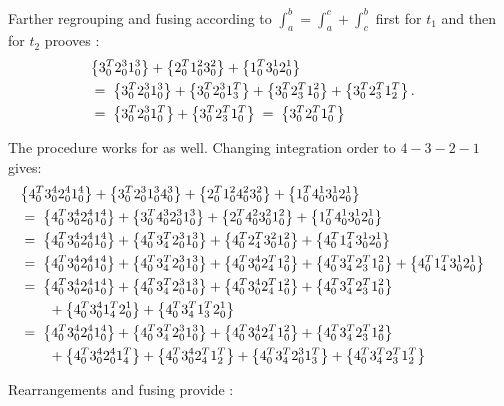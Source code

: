 \documentclass{article}
\def\braced#1{\left\lbrace{#1}\right\rbrace}
\begin{document}
Farther regrouping and fusing according to $\int_a^b = \int_a^c + \int_c^b$ first for $t_1$ and then for $t_2$ prooves :
\begin{align*}
\lefteqn{\braced{3_0^T 2_0^3 1_0^3} + \braced{2_0^T 1_0^2 3_0^2} 
 + \braced{1_0^T 3_0^1 2_0^1}}
\\ & = \; 
\braced{3_0^T 2_0^3 1_0^3}  + \braced{3_0^T 2_0^3 1_3^T} 
+ \braced{3_0^T 2_3^T 1_0^2} + \braced{3_0^T 2_3^T 1_2^T}.
\\ & = \; 
\braced{3_0^T 2_0^3 1_0^T} + \braced{3_0^T 2_3^T 1_0^T} 
\; = \; 
\braced{3_0^T 2_0^T 1_0^T} 

\end{align*}

\p
The procedure works for  as well. Changing integration order to $4-3-2-1$ gives:
\begin{align*}
\lefteqn{\braced{4_0^T 3_0^4 2_0^4 1_0^4} + \braced{3_0^T 2_0^3 1_0^3 4_0^3} 
+ \braced{2_0^T 1_0^2 4_0^2 3_0^2} + \braced{1_0^T 4_0^1 3_0^1 2_0^1}}
\\ & = \; 
\braced{4_0^T 3_0^4 2_0^4 1_0^4} 
+ \braced{3_0^T 4_0^3 2_0^3 1_0^3} 
+ \braced{2_0^T 4_0^2 3_0^2 1_0^2}
+ \braced{1_0^T 4_0^1 3_0^1 2_0^1}
\\ & = \; 
\braced{4_0^T 3_0^4 2_0^4 1_0^4} 
+ \braced{4_0^T 3_4^T 2_0^3 1_0^3} 
+ \braced{4_0^T 2_4^T 3_0^2 1_0^2}
+ \braced{4_0^T 1_4^T 3_0^1 2_0^1}
\\ & = \; 
\braced{4_0^T 3_0^4 2_0^4 1_0^4} 
+ \braced{4_0^T 3_4^T 2_0^3 1_0^3} 
+ \braced{4_0^T 3_0^4 2_4^T 1_0^2}+ \braced{4_0^T 3_4^T 2_3^T 1_0^2}
+ \braced{4_0^T 1_4^T 3_0^1 2_0^1}
\\ & = \; 
\braced{4_0^T 3_0^4 2_0^4 1_0^4} 
+ \braced{4_0^T 3_4^T 2_0^3 1_0^3} 
+ \braced{4_0^T 3_0^4 2_4^T 1_0^2} + \braced{4_0^T 3_4^T 2_3^T 1_0^2}
\\ & \qquad
+ \braced{4_0^T 3_0^4 1_4^T 2_0^1} + \braced{4_0^T 3_4^T 1_3^T 2_0^1}
\\ & = \; 
\braced{4_0^T 3_0^4 2_0^4 1_0^4} 
+ \braced{4_0^T 3_4^T 2_0^3 1_0^3} 
+ \braced{4_0^T 3_0^4 2_4^T 1_0^2} + \braced{4_0^T 3_4^T 2_3^T 1_0^2}
\\ & \qquad
+ \braced{4_0^T 3_0^4 2_0^4 1_4^T} + \braced{4_0^T 3_0^4 2_4^T 1_2^T}
+ \braced{4_0^T 3_4^T 2_0^3 1_3^T} + \braced{4_0^T 3_4^T 2_3^T 1_2^T}
\end{align*}

Rearrangements and fusing provide :
\end{document}
